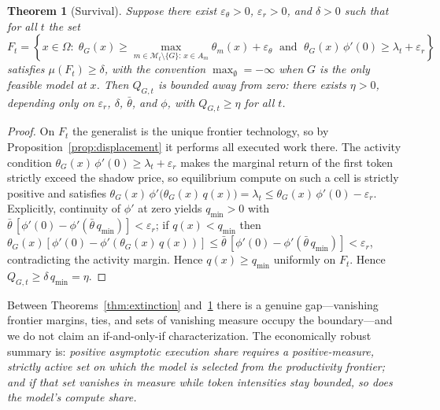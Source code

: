 \documentclass[11pt]{article}
\newtheorem{theorem}{Theorem}
\theoremstyle{definition}
\theoremstyle{remark}
\begin{document}
\begin{theorem}[Survival]
\label{thm:survival}
Suppose there exist $\varepsilon_\theta > 0$, $\varepsilon_r > 0$, and $\delta > 0$ such that for all $t$ the set
\begin{equation}
F_t = \left\{ x \in \Omega :\;
\theta_G(x) \ge \max_{m \in \mathcal{M}_t \setminus \{G\} :\, x \in A_m} \theta_m(x) + \varepsilon_\theta
\;\text{ and }\;
\theta_G(x)\, \phi'(0) \ge \lambda_t + \varepsilon_r
\right\}
\end{equation}
satisfies $\mu(F_t) \ge \delta$, with the convention $\max_\emptyset = -\infty$ when $G$ is the only feasible model at $x$. Then $Q_{G,t}$ is bounded away from zero: there exists $\eta > 0$, depending only on $\varepsilon_r$, $\delta$, $\bar\theta$, and $\phi$, with $Q_{G,t} \ge \eta$ for all $t$.
\end{theorem}

\begin{proof}
On $F_t$ the generalist is the unique frontier technology, so by Proposition~\ref{prop:displacement} it performs all executed work there. The activity condition $\theta_G(x)\,\phi'(0) \ge \lambda_t + \varepsilon_r$ makes the marginal return of the first token strictly exceed the shadow price, so equilibrium compute on such a cell is strictly positive and satisfies $\theta_G(x)\, \phi'\!\big(\theta_G(x)\, q(x)\big) = \lambda_t \le \theta_G(x)\,\phi'(0) - \varepsilon_r$. Explicitly, continuity of $\phi'$ at zero yields $q_{\min} > 0$ with $\bar\theta\,[\phi'(0) - \phi'(\bar\theta\, q_{\min})] < \varepsilon_r$; if $q(x) < q_{\min}$ then $\theta_G(x)[\phi'(0) - \phi'(\theta_G(x)\,q(x))] \le \bar\theta\,[\phi'(0) - \phi'(\bar\theta\, q_{\min})] < \varepsilon_r$, contradicting the activity margin. Hence $q(x) \ge q_{\min}$ uniformly on $F_t$. Hence $Q_{G,t} \ge \delta\, q_{\min} = \eta$.
\end{proof}

Between Theorems~\ref{thm:extinction} and~\ref{thm:survival} there is a genuine gap---vanishing frontier margins, ties, and sets of vanishing measure occupy the boundary---and we do not claim an if-and-only-if characterization. The economically robust summary is: \emph{positive asymptotic execution share requires a positive-measure, strictly active set on which the model is selected from the productivity frontier; and if that set vanishes in measure while token intensities stay bounded, so does the model's compute share.}
\end{document}
